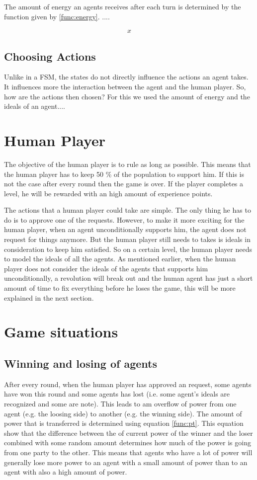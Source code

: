 \documentclass[11pt,a4paper]{article}
\begin{document}
The amount of energy an agents receives after each turn is determined by the function given by \ref{func:energy}. ....

\begin{align}
\label{func:energy}
x
\end{align}

\subsection{Choosing Actions}
Unlike in a FSM, the states do not directly influence the actions an agent takes. It influences more the interaction between the agent and the human player. So, how are the actions then chosen? For this we used the amount of energy and the ideals of an agent....

\section{Human Player}
\label{sec:hp}
The objective of the human player is to rule as long as possible. This means that the human player has to keep 50 \% of the population to support him. If this is not the case after every round then the game is over. If the player completes a level, he will be rewarded with an high amount of experience points. 

The actions that a human player could take are simple. The only thing he has to do is to approve one of the requests. However, to make it more exciting for the human player, when an agent unconditionally supports him, the agent does not request for things anymore. But the human player still needs to takes is ideals in consideration to keep him satisfied. So on a certain level, the human player needs to model the ideals of all the agents. As mentioned earlier, when the human player does not consider the ideals of the agents that supports him unconditionally, a revolution will break out and the human agent has just a short amount of time to fix everything before he loses the game, this will be more explained in the next section. 

\section{Game situations}
\label{sec:gs}

\subsection{Winning and losing of agents}
After every round, when the human player has approved an request, some agents have won this round and some agents has lost (i.e. some agent's ideals are recognized and some are note). This leads to am overflow of power from one agent (e.g. the loosing side) to another (e.g. the winning side). The amount of power that is transferred is determined using equation \ref{func:pt}. This equation show that the difference between the of current power  of the winner and the loser combined with some random amount determines how much of the power is going from one party to the other. This means that agents who have a lot of power will generally lose more power to an agent with a small amount of power than to an agent with also a high amount of power.
\end{document}
